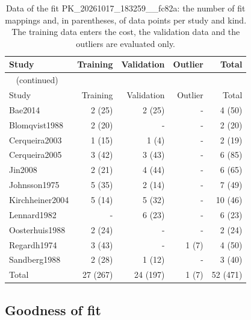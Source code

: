 \begin{longtable}{lrrrr}
\caption{Data of the fit PK\_20261017\_183259\_\_fc82a: the number of fit mappings and, in parentheses, of data points per study and kind. The training data enters the cost, the validation data and the outliers are evaluated only.}\label{tab:data:PK_20261017_183259__fc82a} \\
\toprule
Study & Training & Validation & Outlier & Total \\
\midrule
\endfirsthead
\multicolumn{5}{l}{\small\tablename~\thetable{} (continued)} \\
\toprule
Study & Training & Validation & Outlier & Total \\
\midrule
\endhead
\bottomrule
\endlastfoot
Bae2014 & 2 (25) & 2 (25) & - & 4 (50) \\
Blomqvist1988 & 2 (20) & - & - & 2 (20) \\
Cerqueira2003 & 1 (15) & 1 (4) & - & 2 (19) \\
Cerqueira2005 & 3 (42) & 3 (43) & - & 6 (85) \\
Jin2008 & 2 (21) & 4 (44) & - & 6 (65) \\
Johnsson1975 & 5 (35) & 2 (14) & - & 7 (49) \\
Kirchheiner2004 & 5 (14) & 5 (32) & - & 10 (46) \\
Lennard1982 & - & 6 (23) & - & 6 (23) \\
Oosterhuis1988 & 2 (24) & - & - & 2 (24) \\
Regardh1974 & 3 (43) & - & 1 (7) & 4 (50) \\
Sandberg1988 & 2 (28) & 1 (12) & - & 3 (40) \\
Total & 27 (267) & 24 (197) & 1 (7) & 52 (471) \\
\end{longtable}

\subsection{Goodness of fit}

